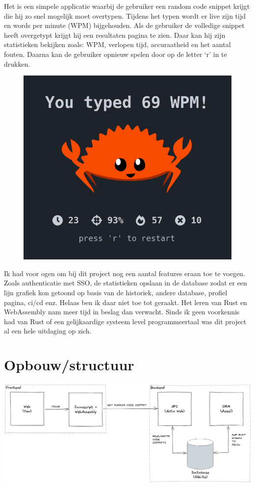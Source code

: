 Het is een simpele applicatie waarbij de gebruiker een random code snippet krijgt die hij zo snel
mogelijk moet overtypen. Tijdens het typen wordt er live zijn tijd en words per minute (WPM)
bijgehouden. Als de gebruiker de volledige snippet heeft overgetypt krijgt hij een resultaten pagina
te zien. Daar kan hij zijn statistieken bekijken zoals: WPM, verlopen tijd, accuraatheid en het
aantal fouten. Daarna kan de gebruiker opnieuw spelen door op de letter ‘r’ in te drukken. 

\begin{figure}
  \centering
  \includegraphics[width=0.78\linewidth]{./figures/result.png}
\end{figure}


Ik had voor ogen om bij dit project nog een aantal features eraan toe te voegen. Zoals authenticatie
met SSO, de statistieken opslaan in de database zodat er een lijn grafiek kon getoond op basis van
de historiek, andere database, profiel pagina, ci/cd enz. Helaas ben ik daar niet toe tot geraakt.
Het leren van Rust en WebAssembly nam meer tijd in beslag dan verwacht. Sinds ik geen voorkennis had
van Rust of een gelijkaardige systeem level programmeertaal was dit project al een hele uitdaging op
zich.

\clearpage

\section{Opbouw/structuur}

\includegraphics[width=\textwidth]{./figures/structuur.png}

